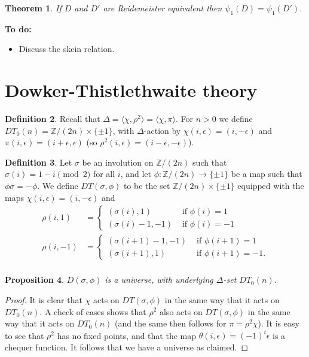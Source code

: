 \documentclass{amsart}
\newcommand{\Z}         {{\mathbb{Z}}}
\newcommand{\tm}        {\times}
\newcommand{\Dl}        {\Delta}
\newcommand{\ep}        {\epsilon}
\newcommand{\tht}       {\theta}
\newcommand{\sg}        {\sigma}
\newcommand{\ip}[1]     {\langle #1\rangle}
\renewcommand{\:}{\colon}
\newtheorem{theorem}{Theorem}[section]
\newtheorem{proposition}[theorem]{Proposition}
\theoremstyle{definition}
\newtheorem{definition}[theorem]{Definition}
\begin{document}
\begin{theorem}
 If $D$ and $D'$ are Reidemeister equivalent then
 $\psi_1(D)=\psi_1(D')$. 
\end{theorem}

\textbf{To do:}
\begin{itemize}
 \item Discuss the skein relation.
\end{itemize}

\section{Dowker-Thistlethwaite theory}

\begin{definition}\label{defn-dowker-zero}
 Recall that $\Dl=\ip{\chi,\rho^2}=\ip{\chi,\pi}$.  For $n>0$ we
 define $DT_0(n)=\Z/(2n)\tm\{\pm 1\}$, with $\Dl$-action by
 $\chi(i,\ep)=(i,-\ep)$ and $\pi(i,\ep)=(i+\ep,\ep)$ (so
 $\rho^2(i,\ep)=(i-\ep,-\ep)$).  
\end{definition}

\begin{definition}\label{defn-dowker}
 Let $\sg$ be an involution on $\Z/(2n)$ such that
 $\sg(i)=1-i\pmod{2}$ for all $i$, and let $\phi\:\Z/(2n)\to\{\pm 1\}$
 be a map such that $\phi\sg=-\phi$.  We define $DT(\sg,\phi)$ to be
 the set $\Z/(2n)\tm\{\pm 1\}$ equipped with the maps
 $\chi(i,\ep)=(i,-\ep)$ and 
 \begin{align*}
  \rho(i, 1) &= \begin{cases}
                 (\sg(i),1)    & \text{ if } \phi(i)=1 \\
                 (\sg(i)-1,-1) & \text{ if } \phi(i)=-1 
                \end{cases} \\
  \rho(i,-1) &= \begin{cases}
                 (\sg(i+1)-1,-1) & \text{ if } \phi(i+1)=1 \\
                 (\sg(i+1), 1)   & \text{ if } \phi(i+1)=-1.
                \end{cases} \\
 \end{align*}
\end{definition}

\begin{proposition}
 $D(\sg,\phi)$ is a universe, with underlying $\Dl$-set $DT_0(n)$. 
\end{proposition}
\begin{proof}
 It is clear that $\chi$ acts on $DT(\sg,\phi)$ in the same way that
 it acts on $DT_0(n)$.  A check of cases shows that $\rho^2$ also acts
 on $DT(\sg,\phi)$ in the same way that it acts on $DT_0(n)$ (and the
 same then follows for $\pi=\rho^2\chi$).  It is easy to see that
 $\rho^2$ has no fixed points, and that the map
 $\tht(i,\ep)=(-1)^i\ep$ is a chequer function.  It follows that we
 have a universe as claimed.
\end{proof}
\end{document}
